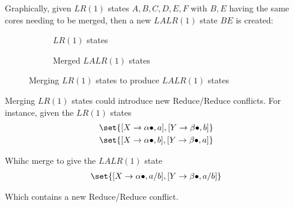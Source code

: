 \begin{definition}
    Graphically, given $LR(1)$ states $A, B, C, D, E, F$ with $B, E$ having the same cores needing to be merged, then a new $LALR(1)$ state $BE$ is created:
    \begin{figure}[H]
        \centering
        \begin{subfigure}{0.45\textwidth}
            \centering
            \caption{$LR(1)$ states}
        \end{subfigure}
        \begin{subfigure}{0.45\textwidth}
            \centering
            \caption{Merged $LALR(1)$ states}
        \end{subfigure}
        \caption{Merging $LR(1)$ states to produce $LALR(1)$ states}
        \label{fig:lalr1-merge}
    \end{figure}
\end{definition}

\begin{remark}
    Merging $LR(1)$ states could introduce new Reduce/Reduce conflicts. For instance, given the $LR(1)$ states
    \begin{equation}
        \begin{aligned}
            &\set{ [X \to \alpha \bullet, a], [Y \to \beta \bullet, b] } \\
            &\set{ [X \to \alpha \bullet, b], [Y \to \beta \bullet, a] }
        \end{aligned}
    \end{equation}
    
    Whihc merge to give the $LALR(1)$ state
    \begin{equation}
        \begin{aligned}
            \set{ [X \to \alpha \bullet, a/b], [Y \to \beta \bullet, a/b] }
        \end{aligned}
    \end{equation}
    
    Which contains a new Reduce/Reduce conflict.
\end{remark}
